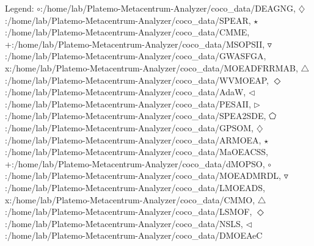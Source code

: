 Legend: {\color{CornflowerBlue}$\circ$}:/home/lab/Platemo-Metacentrum-Analyzer/coco\_data/DEAGNG, {{}$\diamondsuit$}:/home/lab/Platemo-Metacentrum-Analyzer/coco\_data/SPEAR, {\color{Green}$\star$}:/home/lab/Platemo-Metacentrum-Analyzer/coco\_data/CMME, {\color{red}+}:/home/lab/Platemo-Metacentrum-Analyzer/coco\_data/MSOPSII, {\color{brown}$\triangledown$}:/home/lab/Platemo-Metacentrum-Analyzer/coco\_data/GWASFGA, {{}x}:/home/lab/Platemo-Metacentrum-Analyzer/coco\_data/MOEADFRRMAB, {{}$\triangle$}:/home/lab/Platemo-Metacentrum-Analyzer/coco\_data/WVMOEAP, {{}$\Diamond$}:/home/lab/Platemo-Metacentrum-Analyzer/coco\_data/AdaW, {{}$\triangleleft$}:/home/lab/Platemo-Metacentrum-Analyzer/coco\_data/PESAII, {{}$\triangleright$}:/home/lab/Platemo-Metacentrum-Analyzer/coco\_data/SPEA2SDE, {{}$\pentagon$}:/home/lab/Platemo-Metacentrum-Analyzer/coco\_data/GPSOM, {{}$\diamondsuit$}:/home/lab/Platemo-Metacentrum-Analyzer/coco\_data/ARMOEA, {{}$\star$}:/home/lab/Platemo-Metacentrum-Analyzer/coco\_data/MaOEACSS, {{}+}:/home/lab/Platemo-Metacentrum-Analyzer/coco\_data/dMOPSO, {{}$\circ$}:/home/lab/Platemo-Metacentrum-Analyzer/coco\_data/MOEADMRDL, {{}$\triangledown$}:/home/lab/Platemo-Metacentrum-Analyzer/coco\_data/LMOEADS, {{}x}:/home/lab/Platemo-Metacentrum-Analyzer/coco\_data/CMMO, {{}$\triangle$}:/home/lab/Platemo-Metacentrum-Analyzer/coco\_data/LSMOF, {{}$\Diamond$}:/home/lab/Platemo-Metacentrum-Analyzer/coco\_data/NSLS, {{}$\triangleleft$}:/home/lab/Platemo-Metacentrum-Analyzer/coco\_data/DMOEAeC